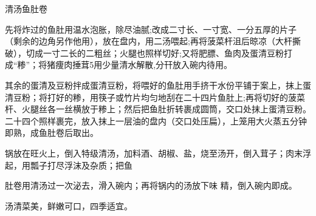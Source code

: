 \begin{recipe}{清汤鱼肚卷}

\ingredients


\cooking

\step 先将炸过的鱼肚用温水泡胀，除尽油腻;改成二寸长、一寸宽、一分五厚的片子（剩余的边角另作他用），放在盘内，用二汤喂起;再将菠菜杆沮后晾凉（大杆撕破），切成一寸二长的二粗丝；火腿也照样切好;又将肥膘、鱼肉及蛋清豆粉打成“糁”；将猪痩肉捶茸5用少量清水解散,分幵放入碗内待用。

\step 其余的蛋清及豆粉拌成蛋清豆粉，将喂好的鱼肚用手挤干水份平铺于案上，抹上蛋清豆粉；将打好的糁，用筷子或竹片均匀地刮在二十四片鱼肚上;再将切好的菠菜杆、火腿丝各一丝横放于糁上；然后把鱼肚折转裹成圆筒，交口处抹上蛋清豆粉。二十四个照样裹完，放入抹上一层油的盘内（交口处压扁），上笼用大火蒸五分钟即熟，成鱼肚卷后取出。

\step 锅放在旺火上，倒入特级清汤，加料酒、胡椒、盐，烧至汤开，倒入茸子；肉末浮起，用瓢子打尽浮沫及杂质；把鱼

肚卷用清汤过一次泌去，滑入碗内；再将锅内的汤放下味 精，倒入碗内即成。

\notes

汤清菜美，鲜嫩可口，四季适宜。

\end{recipe}

